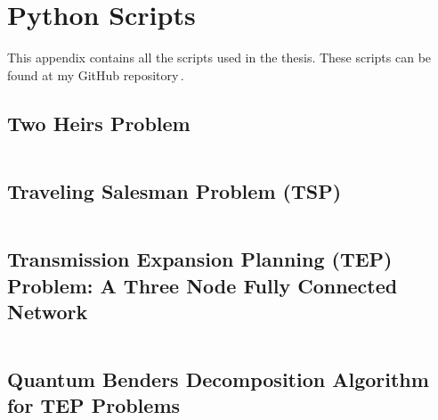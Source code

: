 
\chapter{Python Scripts} %

This appendix contains all the scripts used in the thesis. These scripts can be found at my GitHub repository\,\cite{LopezBanos2023}.
\label{AppendixD} %
\section{Two Heirs Problem}
\inputminted[linenos]{python}{_scripts/Two_Heirs.py}
\section{Traveling Salesman Problem (TSP)}
\inputminted[linenos]{python}{_scripts/tsp_simulated_annealing.py}
\section{Transmission Expansion Planning (TEP) Problem: A Three Node Fully Connected Network}
\inputminted[linenos]{python}{_scripts/SingleDemand_ThreeNode_CQM.py}
\section{Quantum Benders Decomposition Algorithm for TEP Problems}